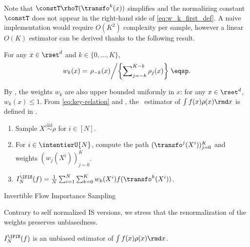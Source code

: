 Note that $\constT\rhoT(\transfo^{k}(x))$ simplifies and the
normalizing constant $\constT$ does not appear in the right-hand
side of \eqref{eq:w_k_first_def}. A naive implementation would require $O(K^2)$ complexity per sample, however a linear $O(K)$ estimator can be derived thanks to the following result.
\begin{lemma}
\label{SPlemma:weights}
For any $x \in \rset^d$ and $k \in\{0, \dots, K\}$,
\begin{equation}
  \label{eq:def_w_k}
    w_{k}(x) =  \left.  \rho_{-k}(x) \middle / \left\{ \sum\nolimits_{j=-k}^{K-k} \rho_{j}(x) \right\} \right. \eqsp.
\end{equation}
\end{lemma}
By , the weights $w_{k}$ are also upper bounded uniformly in $x$: for any $x \in \rset^d$,  $w_{k}(x) \leq 1$. From \eqref{eq:key-relation} and , the \IFIS\ estimator of $\int f(x) \rho(x) \rmd x$ is defined in .
\begin{algorithm}
\begin{enumerate}[wide, labelwidth=!, labelindent=0pt, label=(\arabic*)]
\item Sample $X^i \overset{\text{iid}}{\sim} \rho$ for $i\in[N]$.
\item For $i \in \intentierU{N}$, compute the
  path $(\transfo^j(X^i))_{j =0}^K$ and weights $(w_j(X^i))_{j =0}^K$. 
\item$I^{\IFIS}_N(f) =   \tfrac{1}{N} \sum_{i=1}^N \sum_{k=0}^K w_k(X^i)  f(\transfo^k(X^i))$. 
\end{enumerate}
\caption{Invertible Flow Importance Sampling}
\label{algo:IFIS}
\end{algorithm}
Contrary to self normalized IS versions, we stress that the renormalization of the weights  preserves unbiasedness. 
\begin{theorem}
\label{theo:importance-sampling}
$I^{\IFIS}_N(f)$ is an unbiased estimator of $\int f(x) \rho(x) \rmd x$.
\end{theorem}

